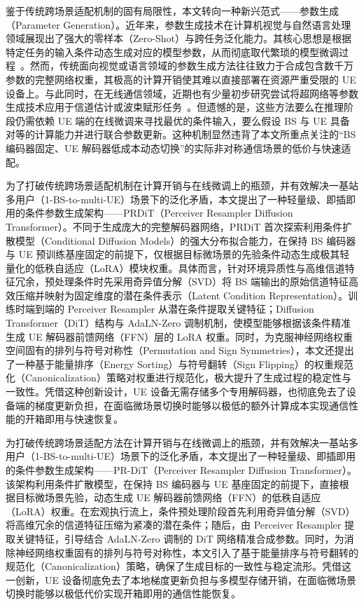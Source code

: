 \documentclass[12pt,a4paper]{article}
\begin{document}
鉴于传统跨场景适配机制的固有局限性，本文转向一种新兴范式——参数生成（Parameter Generation）。近年来，参数生成技术在计算机视觉与自然语言处理领域展现出了强大的零样本（Zero-Shot）与跨任务泛化能力。其核心思想是根据特定任务的输入条件动态生成对应的模型参数，从而彻底取代繁琐的模型微调过程~\cite{wang2024neural}。然而，传统面向视觉或语言领域的参数生成方法往往致力于合成包含数千万参数的完整网络权重，其极高的计算开销使其难以直接部署在资源严重受限的 UE 设备上。与此同时，在无线通信领域，近期也有少量初步研究尝试将超网络等参数生成技术应用于信道估计或波束赋形任务~\cite{liu2025hypernetwork}。但遗憾的是，这些方法要么在推理阶段仍需依赖 UE 端的在线微调来寻找最优的条件输入，要么假设 BS 与 UE 具备对等的计算能力并进行联合参数更新。这种机制显然违背了本文所重点关注的“BS 编码器固定、UE 解码器低成本动态切换”的实际非对称通信场景的低价与快速适配。  

为了打破传统跨场景适配机制在计算开销与在线微调上的瓶颈，并有效解决一基站多用户（1-BS-to-multi-UE）场景下的泛化矛盾，本文提出了一种轻量级、即插即用的条件参数生成架构——PRDiT（Perceiver Resampler Diffusion Transformer）。不同于生成庞大的完整解码器网络，PRDiT 首次探索利用条件扩散模型（Conditional Diffusion Models）的强大分布拟合能力，在保持 BS 编码器与 UE 预训练基座固定的前提下，仅根据目标微场景的先验条件动态生成极其轻量化的低秩自适应（LoRA）模块权重。具体而言，针对环境异质性与高维信道特征冗余，预处理条件时先采用奇异值分解（SVD）将 BS 端输出的原始信道特征高效压缩并映射为固定维度的潜在条件表示（Latent Condition Representation）。训练时端到端的 Perceiver Resampler 从潜在条件提取关键特征；Diffusion Transformer（DiT）结构与 AdaLN-Zero 调制机制，使模型能够根据该条件精准生成 UE 解码器前馈网络（FFN）层的 LoRA 权重。同时，为克服神经网络权重空间固有的排列与符号对称性（Permutation and Sign Symmetries），本文还提出了一种基于能量排序（Energy Sorting）与符号翻转（Sign Flipping）的权重规范化（Canonicalization）策略对权重进行规范化，极大提升了生成过程的稳定性与一致性。凭借这种创新设计，UE 设备无需存储多个专用解码器，也彻底免去了设备端的梯度更新负担，在面临微场景切换时能够以极低的额外计算成本实现通信性能的开箱即用与快速恢复。


为打破传统跨场景适配方法在计算开销与在线微调上的瓶颈，并有效解决一基站多用户（1-BS-to-multi-UE）场景下的泛化矛盾，本文提出了一种轻量级、即插即用的条件参数生成架构——PR-DiT（Perceiver Resampler Diffusion Transformer）。该架构利用条件扩散模型，在保持 BS 编码器与 UE 基座固定的前提下，直接根据目标微场景先验，动态生成 UE 解码器前馈网络（FFN）的低秩自适应（LoRA）权重。在宏观执行流上，条件预处理阶段首先利用奇异值分解（SVD）将高维冗余的信道特征压缩为紧凑的潜在条件；随后，由 Perceiver Resampler 提取关键特征，引导结合 AdaLN-Zero 调制的 DiT 网络精准合成参数。同时，为消除神经网络权重固有的排列与符号对称性，本文引入了基于能量排序与符号翻转的规范化（Canonicalization）策略，确保了生成目标的一致性与稳定流形。凭借这一创新，UE 设备彻底免去了本地梯度更新负担与多模型存储开销，在面临微场景切换时能够以极低代价实现开箱即用的通信性能恢复。
\end{document}
